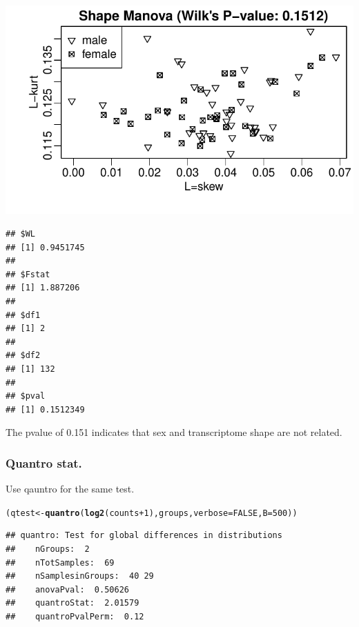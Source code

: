 \documentclass{article}\usepackage[]{graphicx}\usepackage[usenames,dvipsnames]{color}
\makeatletter
\def\maxwidth{ %
  \ifdim\Gin@nat@width>\linewidth
    \linewidth
  \else
    \Gin@nat@width
  \fi
}
\newcommand{\hlnum}[1]{\textcolor[rgb]{0.686,0.059,0.569}{#1}}%
\newcommand{\hlopt}[1]{\textcolor[rgb]{0,0,0}{#1}}%
\newcommand{\hlstd}[1]{\textcolor[rgb]{0.345,0.345,0.345}{#1}}%
\newcommand{\hlkwb}[1]{\textcolor[rgb]{0.69,0.353,0.396}{#1}}%
\newcommand{\hlkwc}[1]{\textcolor[rgb]{0.333,0.667,0.333}{#1}}%
\newcommand{\hlkwd}[1]{\textcolor[rgb]{0.737,0.353,0.396}{\textbf{#1}}}%
\newenvironment{kframe}{%
 \def\at@end@of@kframe{}%
 \ifinner\ifhmode%
  \def\at@end@of@kframe{\end{minipage}}%
  \begin{minipage}{\columnwidth}%
 \fi\fi%
 \def\FrameCommand##1{\hskip\@totalleftmargin \hskip-\fboxsep
 \colorbox{shadecolor}{##1}\hskip-\fboxsep
     \hskip-\linewidth \hskip-\@totalleftmargin \hskip\columnwidth}%
 \MakeFramed {\advance\hsize-\width
   \@totalleftmargin\z@ \linewidth\hsize
   \@setminipage}}%
 {\par\unskip\endMakeFramed%
 \at@end@of@kframe}
\newenvironment{knitrout}{}{} %
\makeatother
\begin{document}
\begin{knitrout}
\color{fgcolor}

{\centering \includegraphics[width=\maxwidth]{figure/lrats-1} 

}


\begin{kframe}\begin{verbatim}
## $WL
## [1] 0.9451745
## 
## $Fstat
## [1] 1.887206
## 
## $df1
## [1] 2
## 
## $df2
## [1] 132
## 
## $pval
## [1] 0.1512349
\end{verbatim}
\end{kframe}
\end{knitrout}

The pvalue of 0.151 indicates that sex and transcriptome shape are not
related.

\subsubsection{Quantro stat.}

Use qauntro for the same test. 

\begin{knitrout}
\color{fgcolor}\begin{kframe}
\begin{alltt}
\hlstd{(qtest} \hlkwb{<-} \hlkwd{quantro}\hlstd{(}\hlkwd{log2}\hlstd{(counts}\hlopt{+}\hlnum{1}\hlstd{), groups,} \hlkwc{verbose}\hlstd{=}\hlnum{FALSE}\hlstd{,} \hlkwc{B}\hlstd{=}\hlnum{500}\hlstd{))}
\end{alltt}
\begin{verbatim}
## quantro: Test for global differences in distributions
##    nGroups:  2 
##    nTotSamples:  69 
##    nSamplesinGroups:  40 29 
##    anovaPval:  0.50626 
##    quantroStat:  2.01579 
##    quantroPvalPerm:  0.12
\end{verbatim}
\end{kframe}
\end{knitrout}
\end{document}
